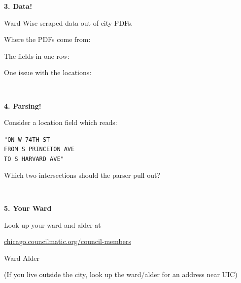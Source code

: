 \documentclass[11pt]{article}
\newcommand{\blankspace}[1]{%
  \vspace{0.3em}
  \begin{minipage}[t][#1][t]{\linewidth}
  \end{minipage}
  \vspace{0.3em}
}
\newcommand{\guidedopen}[4]{%
  \noindent\textbf{#1}\\[0.18em]
  \noindent
  \begin{minipage}[t]{0.485\textwidth}
    #2
    \blankspace{#3}
  \end{minipage}
  \hfill
  \begin{minipage}[t]{0.485\textwidth}
    \blankspace{#4}
  \end{minipage}
  \\[0.4em]
}
\begin{document}
\vfill

\guidedopen{3. Data!}{
Ward Wise scraped data out of city PDFs.

\vspace{0.35em}
Where the PDFs come from:
\vspace{1.0cm}

The fields in one row:
\vspace{1.0cm}

One issue with the locations:
}{1.4cm}{4.6cm}

\vfill

\newpage

\guidedopen{4. Parsing!}{
Consider a location field which reads:

\vspace{0.25em}
{\small\texttt{"ON W 74TH ST\\FROM S PRINCETON AVE\\TO S HARVARD AVE"}}

\vspace{0.4em}
Which two intersections should the parser pull out?
}{1.6cm}{3.4cm}

\vfill

\guidedopen{5. Your Ward}{
Look up your ward and alder at

\vspace{0.2em}
\url{chicago.councilmatic.org/council-members}

\vspace{0.4em}
Ward \underline{\hspace{1.6cm}} \quad Alder \underline{\hspace{3.1cm}}

\vspace{0.35em}
(If you live outside the city, look up the ward/alder for an address near UIC)}{2.2cm}{3.2cm}
\end{document}
